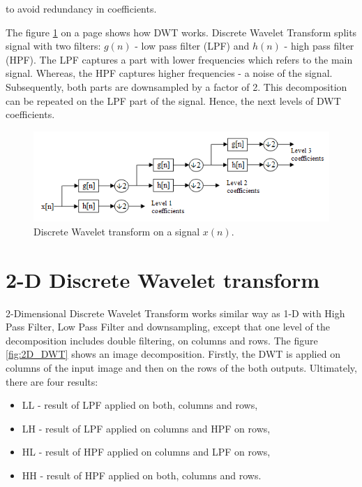 to avoid redundancy in coefficients.


The figure \ref{fig:DWT} on a page \pageref{fig:DWT} shows how DWT works. Discrete Wavelet Transform splits signal with two filters: $g(n)$ - low pass filter (LPF) and $h(n)$ - high pass filter (HPF). The LPF captures a part with lower frequencies which refers to the main signal. Whereas, the HPF captures higher frequencies - a noise of the signal. Subsequently, both parts are downsampled by a factor of 2. This decomposition can be repeated on the LPF part of the signal. Hence, the next levels of DWT coefficients.

\begin{figure}[h]
	\centering
	\includegraphics[width=\textwidth]{DWT.png}
	\caption{Discrete Wavelet transform on a signal $x(n)$.}
	\label{fig:DWT}
\end{figure}


\section{2-D Discrete Wavelet transform}
\label{sec:2D_DWT}

2-Dimensional Discrete Wavelet Transform works similar way as 1-D with High Pass Filter, Low Pass Filter and downsampling, except that one level of the decomposition includes double filtering, on columns and rows. The figure \ref{fig:2D_DWT} shows an image decomposition. Firstly, the DWT is applied on columns of the input image and then on the rows of the both outputs. Ultimately, there are four results:

\begin{itemize}
\item LL - result of LPF applied on both, columns and rows,
\item LH - result of LPF applied on columns and HPF on rows,
\item HL - result of HPF applied on columns and LPF on rows,
\item HH - result of HPF applied on both, columns and rows.
\end{itemize}  

